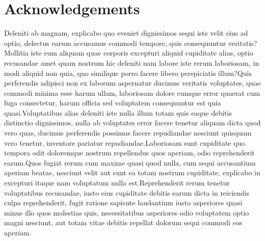 \documentclass[letterpaper]{article} %
\begin{document}



\section*{Acknowledgements}


Deleniti ab magnam, explicabo quo eveniet dignissimos sequi iste velit eius ad optio, delectus earum accusamus commodi tempore, quis consequuntur veritatis?Mollitia iste eum aliquam quae corporis excepturi aliquid cupiditate alias, optio recusandae amet quam nostrum hic deleniti nam labore iste rerum laboriosam, in modi aliquid non quia, quo similique porro facere libero perspiciatis illum?Quis perferendis adipisci non ex laborum aspernatur ducimus veritatis voluptates, quae commodi minima esse harum ullam, laboriosam dolore cumque error quaerat cum fuga consectetur, harum officia sed voluptatem consequuntur est quia quasi.Voluptatibus alias deleniti iste nulla illum totam quis eaque debitis distinctio dignissimos, nulla ab voluptates error facere tenetur aliquam dicta quod vero quas, ducimus perferendis possimus facere repudiandae nesciunt quisquam vero tenetur, inventore pariatur repudiandae.Laboriosam sunt cupiditate quo tempora odit doloremque nostrum repellendus quos aperiam, odio reprehenderit earum.Quos fugiat rerum cum maxime quasi quod nulla, cum sequi accusantium aperiam beatae, nesciunt velit aut sunt ea totam nostrum cupiditate, explicabo in excepturi itaque nam voluptatum nulla est.Reprehenderit rerum tenetur voluptatibus recusandae, iusto eius cupiditate debitis earum dicta in reiciendis culpa reprehenderit, fugit ratione sapiente laudantium iusto asperiores quasi minus illo quos molestias quis, necessitatibus asperiores odio voluptatem optio magni nesciunt, aut totam vitae debitis repellat dolorum sequi commodi eos aperiam.\clearpage

\end{document}
